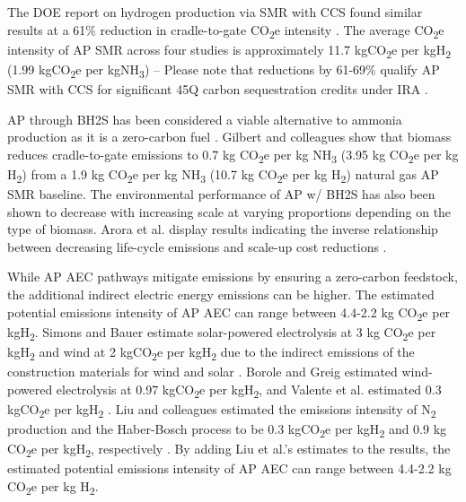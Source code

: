 \documentclass{article}
\begin{document}
The DOE report on hydrogen production via SMR with CCS found similar results at a 61\% reduction in cradle-to-gate CO\textsubscript{2}e intensity \cite{LEWIS2022}. The average CO\textsubscript{2}e intensity of AP SMR across four studies is approximately 11.7 kgCO\textsubscript{2}e per kgH\textsubscript{2} (1.99 kgCO\textsubscript{2}e per kgNH\textsubscript{3}) \cite{Bicer2016, Bicer2017, Liu2020} – Please note that reductions by 61-69\% qualify AP SMR with CCS for significant 45Q carbon sequestration credits under IRA \cite{LEWIS2022, Bauer2022, IRA2022}.

AP through BH2S has been considered a viable alternative to ammonia production as it is a zero-carbon fuel \cite{Arora2016, Arora2017, Gilbert2014}. Gilbert and colleagues show that biomass reduces cradle-to-gate emissions to 0.7 kg CO\textsubscript{2}e per kg NH\textsubscript{3} (3.95 kg CO\textsubscript{2}e per kg H\textsubscript{2}) from a 1.9 kg CO\textsubscript{2}e per kg NH\textsubscript{3} (10.7 kg CO\textsubscript{2}e per kg H\textsubscript{2}) natural gas AP SMR baseline\cite{Gilbert2014}. The environmental performance of AP w/ BH2S has also been shown to decrease with increasing scale at varying proportions depending on the type of biomass. Arora et al. display results indicating the inverse relationship between decreasing life-cycle emissions and scale-up cost reductions \cite{Arora2017}.

While AP AEC pathways mitigate emissions by ensuring a zero-carbon feedstock, the additional indirect electric energy emissions can be higher. The estimated potential emissions intensity of AP AEC can range between 4.4-2.2 kg CO\textsubscript{2}e per kgH\textsubscript{2}. Simons and Bauer estimate solar-powered electrolysis at 3 kg CO\textsubscript{2}e per kgH\textsubscript{2} and wind at 2 kgCO\textsubscript{2}e per kgH\textsubscript{2} due to the indirect emissions of the construction materials for wind and solar \cite{Simons2011}. Borole and Greig estimated wind-powered electrolysis at 0.97 kgCO\textsubscript{2}e per kgH\textsubscript{2}, and Valente et al. estimated 0.3 kgCO\textsubscript{2}e per kgH\textsubscript{2} \cite{Borole2019, Valente2020}. Liu and colleagues estimated the emissions intensity of N\textsubscript{2} production and the Haber-Bosch process to be 0.3 kgCO\textsubscript{2}e per kgH\textsubscript{2} and 0.9 kg CO\textsubscript{2}e per kgH\textsubscript{2}, respectively \cite{Liu2020}. By adding Liu et al.’s estimates to the results, the estimated potential emissions intensity of AP AEC can range between 4.4-2.2 kg CO\textsubscript{2}e per kg H\textsubscript{2}.
\end{document}
